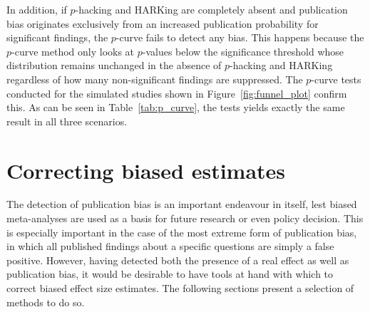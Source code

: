 In addition, if $p$-hacking and HARKing are completely absent and publication bias originates exclusively from an increased publication probability for significant findings, the $p$-curve fails to detect any bias. This happens because the $p$-curve method only looks at $p$-values below the significance threshold whose distribution remains unchanged in the absence of $p$-hacking and HARKing regardless of how many non-significant findings are suppressed. The $p$-curve tests conducted for the simulated studies shown in Figure~\ref{fig:funnel_plot} confirm this. As can be seen in Table~\ref{tab:p_curve}, the tests yields exactly the same result in all three scenarios.\par


\section{Correcting biased estimates}
\label{sec:correct_publication_bias}
The detection of publication bias is an important endeavour in itself, lest biased meta-analyses are used as a basis for future research or even policy decision. This is especially important in the case of the most extreme form of publication bias, in which all published findings about a specific questions are simply a false positive. However, having detected both the presence of a real effect as well as publication bias, it would be desirable to have tools at hand with which to correct biased effect size estimates. The following sections present a selection of methods to do so. 
